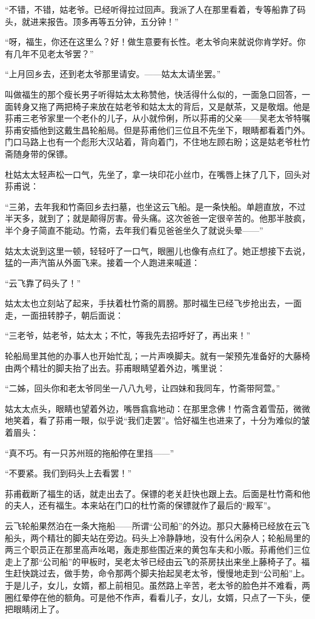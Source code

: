 \par “不错，不错，姑老爷。已经听得拉过回声。我派了人在那里看着，专等船靠了码头，就进来报告。顶多再等五分钟，五分钟！”
\par “呀，福生，你还在这里么？好！做生意要有长性。老太爷向来就说你肯学好。你有几年不见老太爷罢？”
\par “上月回乡去，还到老太爷那里请安。——姑太太请坐罢。”
\par 叫做福生的那个瘦长男子听得姑太太称赞他，快活得什么似的，一面急口回答，一面转身又拖了两把椅子来放在姑老爷和姑太太的背后，又是献茶，又是敬烟。他是荪甫三老爷家里一个老仆的儿子，从小就伶俐，所以荪甫的父亲——吴老太爷特嘱荪甫安插他到这戴生昌轮船局。但是荪甫他们三位且不先坐下，眼睛都看着门外。门口马路上也有一个彪形大汉站着，背向着门，不住地左顾右盼；这是姑老爷杜竹斋随身带的保镖。
\par 杜姑太太轻声松一口气，先坐了，拿一块印花小丝巾，在嘴唇上抹了几下，回头对荪甫说：
\par “三弟，去年我和竹斋回乡去扫墓，也坐这云飞船。是一条快船。单趟直放，不过半天多，就到了；就是颠得厉害。骨头痛。这次爸爸一定很辛苦的。他那半肢疯，半个身子简直不能动。竹斋，去年我们看见爸爸坐久了就说头晕——”
\par 姑太太说到这里一顿，轻轻吁了一口气，眼圈儿也像有点红了。她正想接下去说，猛的一声汽笛从外面飞来。接着一个人跑进来喊道：
\par “云飞靠了码头了！”
\par 姑太太也立刻站了起来，手扶着杜竹斋的肩膀。那时福生已经飞步抢出去，一面走，一面扭转脖子，朝后面说：
\par “三老爷，姑老爷，姑太太；不忙，等我先去招呼好了，再出来！”
\par 轮船局里其他的办事人也开始忙乱；一片声唤脚夫。就有一架预先准备好的大藤椅由两个精壮的脚夫抬了出去。荪甫眼睛望着外边，嘴里说：
\par “二姊，回头你和老太爷同坐一八八九号，让四妹和我同车，竹斋带阿萱。”
\par 姑太太点头，眼睛也望着外边，嘴唇翕翕地动：在那里念佛！竹斋含着雪茄，微微地笑着，看了荪甫一眼，似乎说“我们走罢”。恰好福生也进来了，十分为难似的皱着眉头：
\par “真不巧。有一只苏州班的拖船停在里挡——”
\par “不要紧。我们到码头上去看罢！”
\par 荪甫截断了福生的话，就走出去了。保镖的老关赶快也跟上去。后面是杜竹斋和他的夫人，还有福生。本来站在门口的杜竹斋的保镖就作了最后的“殿军”。
\par 云飞轮船果然泊在一条大拖船——所谓“公司船”的外边。那只大藤椅已经放在云飞船头，两个精壮的脚夫站在旁边。码头上冷静静地，没有什么闲杂人；轮船局里的两三个职员正在那里高声吆喝，轰走那些围近来的黄包车夫和小贩。荪甫他们三位走上了那“公司船”的甲板时，吴老太爷已经由云飞的茶房扶出来坐上藤椅子了。福生赶快跳过去，做手势，命令那两个脚夫抬起吴老太爷，慢慢地走到“公司船”上。于是儿子，女儿，女婿，都上前相见。虽然路上辛苦，老太爷的脸色并不难看，两圈红晕停在他的额角。可是他不作声，看看儿子，女儿，女婿，只点了一下头，便把眼睛闭上了。
